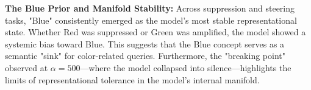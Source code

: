 \textbf{The Blue Prior and Manifold Stability:} Across suppression and steering tasks, "Blue" consistently emerged as the model's most stable representational state. Whether Red was suppressed or Green was amplified, the model showed a systemic bias toward Blue. This suggests that the Blue concept serves as a semantic "sink" for color-related queries. Furthermore, the "breaking point" observed at $\alpha=500$—where the model collapsed into silence—highlights the limits of representational tolerance in the model's internal manifold.
